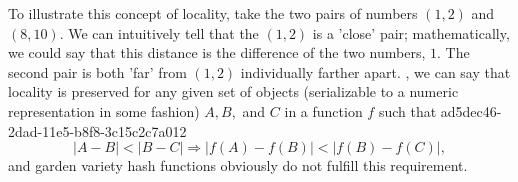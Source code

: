 \documentclass[12pt]{article}
\begin{document}
\par To illustrate this concept of locality, take the two pairs of numbers $(1,2)$ and $(8,10)$. We can intuitively tell that the $(1,2)$ is a 'close' pair; mathematically, we could say that this distance is the difference of the two numbers, $1$. The second pair is both 'far' from $(1,2)$ individually farther apart. , we can say that locality is preserved for any given set of objects (serializable to a numeric representation in some fashion) $A,B,$ and $C$ in a function $f$ such that
ad5dec46-2dad-11e5-b8f8-3c15c2c7a012\begin{equation}
|A-B| < |B-C| \Rightarrow |f(A)-f(B)| < |f(B) - f(C)|,
\end{equation}
and garden variety hash functions obviously do not fulfill this requirement.

\printbibliography
\end{document}
